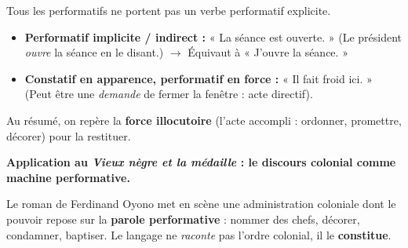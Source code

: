 \documentclass[11pt]{article}
\begin{document}
\begin{attention}
Tous les performatifs ne portent pas un verbe performatif explicite.
\begin{itemize}
    \item \textbf{Performatif implicite / indirect :} « La séance est ouverte. » (Le président \emph{ouvre} la séance en le disant.) $\rightarrow$ Équivaut à « J'ouvre la séance. »
    \item \textbf{Constatif en apparence, performatif en force :} « Il fait froid ici. » (Peut être une \emph{demande} de fermer la fenêtre : acte directif).
\end{itemize}
Au résumé, on repère la \textbf{force illocutoire} (l'acte accompli : ordonner, promettre, décorer) pour la restituer.
\end{attention}

\textbf{Application au \emph{Vieux nègre et la médaille} : le discours colonial comme machine performative.}\par
Le roman de Ferdinand Oyono met en scène une administration coloniale dont le pouvoir repose sur la \textbf{parole performative} : nommer des chefs, décorer, condamner, baptiser. Le langage ne \emph{raconte} pas l'ordre colonial, il le \textbf{constitue}.
\end{document}
